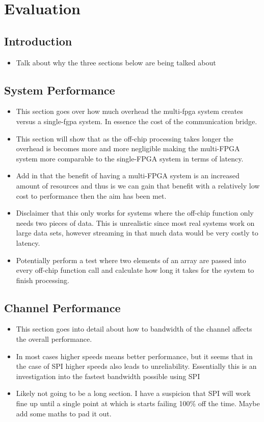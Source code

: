 \chapter{Evaluation}

\section{Introduction}

\begin{itemize}
    \item Talk about why the three sections below are being talked about
\end{itemize}

\section{System Performance}

\begin{itemize}
    \item This section goes over how much overhead the multi-fpga system creates versus a single-fgpa system. In essence the cost of the communication bridge.
    \item This section will show that as the off-chip processing takes longer the overhead is becomes more and more negligible making the multi-FPGA system more comparable to the single-FPGA system in terms of latency.
    \item Add in that the benefit of having a multi-FPGA system is an increased amount of resources and thus is we can gain that benefit with a relatively low cost to performance then the aim has been met.
    \item Disclaimer that this only works for systems where the off-chip function only needs two pieces of data. This is unrealistic since most real systems work on large data sets, however streaming in that much data would be very costly to latency.
    \item Potentially perform a test where two elements of an array are passed into every off-chip function call and calculate how long it takes for the system to finish processing.
\end{itemize}

\section{Channel Performance}

\begin{itemize}
    \item This section goes into detail about how to bandwidth of the channel affects the overall performance. 
    \item In most cases higher speeds means better performance, but it seems that in the case of SPI higher speeds also leads to unreliability. Essentially this is an investigation into the fastest bandwidth possible using SPI
    \item Likely not going to be a long section. I have a suspicion that SPI will work fine up until a single point at which is starts failing 100\% off the time. Maybe add some maths to pad it out.
\end{itemize}

